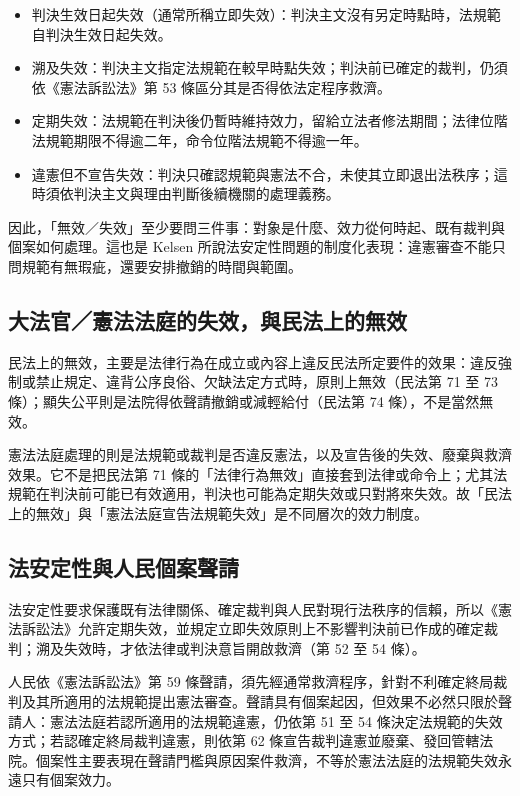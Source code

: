 \begin{itemize}
\tightlist
\item
  判決生效日起失效（通常所稱立即失效）：判決主文沒有另定時點時，法規範自判決生效日起失效。
\item
  溯及失效：判決主文指定法規範在較早時點失效；判決前已確定的裁判，仍須依《憲法訴訟法》第 53 條區分其是否得依法定程序救濟。
\item
  定期失效：法規範在判決後仍暫時維持效力，留給立法者修法期間；法律位階法規範期限不得逾二年，命令位階法規範不得逾一年。
\item
  違憲但不宣告失效：判決只確認規範與憲法不合，未使其立即退出法秩序；這時須依判決主文與理由判斷後續機關的處理義務。
\end{itemize}

因此，「無效／失效」至少要問三件事：對象是什麼、效力從何時起、既有裁判與個案如何處理。這也是 Kelsen 所說法安定性問題的制度化表現：違憲審查不能只問規範有無瑕疵，還要安排撤銷的時間與範圍。

\subsection{大法官／憲法法庭的失效，與民法上的無效}

民法上的無效，主要是法律行為在成立或內容上違反民法所定要件的效果：違反強制或禁止規定、違背公序良俗、欠缺法定方式時，原則上無效（民法第 71 至 73 條）；顯失公平則是法院得依聲請撤銷或減輕給付（民法第 74 條），不是當然無效。

憲法法庭處理的則是法規範或裁判是否違反憲法，以及宣告後的失效、廢棄與救濟效果。它不是把民法第 71 條的「法律行為無效」直接套到法律或命令上；尤其法規範在判決前可能已有效適用，判決也可能為定期失效或只對將來失效。故「民法上的無效」與「憲法法庭宣告法規範失效」是不同層次的效力制度。

\subsection{法安定性與人民個案聲請}

法安定性要求保護既有法律關係、確定裁判與人民對現行法秩序的信賴，所以《憲法訴訟法》允許定期失效，並規定立即失效原則上不影響判決前已作成的確定裁判；溯及失效時，才依法律或判決意旨開啟救濟（第 52 至 54 條）。

人民依《憲法訴訟法》第 59 條聲請，須先經通常救濟程序，針對不利確定終局裁判及其所適用的法規範提出憲法審查。聲請具有個案起因，但效果不必然只限於聲請人：憲法法庭若認所適用的法規範違憲，仍依第 51 至 54 條決定法規範的失效方式；若認確定終局裁判違憲，則依第 62 條宣告裁判違憲並廢棄、發回管轄法院。個案性主要表現在聲請門檻與原因案件救濟，不等於憲法法庭的法規範失效永遠只有個案效力。

